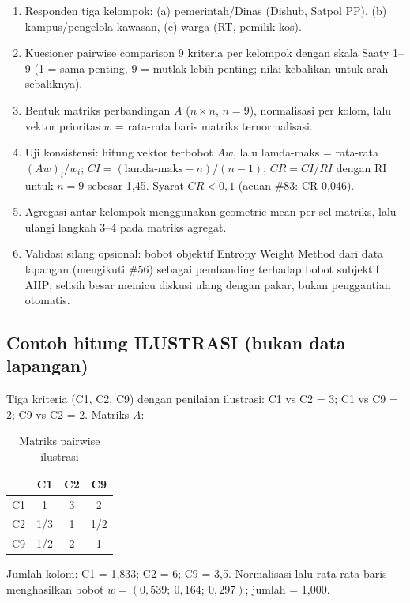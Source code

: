 \documentclass[a4paper,11pt]{article}
\begin{document}
\begin{enumerate}
\item Responden tiga kelompok: (a) pemerintah/Dinas (Dishub, Satpol PP), (b) kampus/pengelola kawasan, (c) warga (RT, pemilik kos).
\item Kuesioner pairwise comparison 9 kriteria per kelompok dengan skala Saaty 1--9 (1 = sama penting, 9 = mutlak lebih penting; nilai kebalikan untuk arah sebaliknya).
\item Bentuk matriks perbandingan \(A\) (\(n \times n\), \(n = 9\)), normalisasi per kolom, lalu vektor prioritas \(w\) = rata-rata baris matriks ternormalisasi.
\item Uji konsistensi: hitung vektor terbobot \(Aw\), lalu lamda-maks = rata-rata \((Aw)_i / w_i\); \(CI = (\text{lamda-maks} - n)/(n-1)\); \(CR = CI/RI\) dengan RI untuk \(n = 9\) sebesar 1,45. Syarat \(CR < 0{,}1\) (acuan \#83: CR 0,046).
\item Agregasi antar kelompok menggunakan geometric mean per sel matriks, lalu ulangi langkah 3--4 pada matriks agregat.
\item Validasi silang opsional: bobot objektif Entropy Weight Method dari data lapangan (mengikuti \#56) sebagai pembanding terhadap bobot subjektif AHP; selisih besar memicu diskusi ulang dengan pakar, bukan penggantian otomatis.
\end{enumerate}

\subsection{Contoh hitung ILUSTRASI (bukan data lapangan)}

Tiga kriteria (C1, C2, C9) dengan penilaian ilustrasi: C1 vs C2 = 3; C1 vs C9 = 2; C9 vs C2 = 2. Matriks \(A\):

\begin{table}[htbp]
\centering
\begin{tabular}{c|ccc}
\toprule
 & C1 & C2 & C9 \\
\midrule
C1 & 1 & 3 & 2 \\
C2 & 1/3 & 1 & 1/2 \\
C9 & 1/2 & 2 & 1 \\
\bottomrule
\end{tabular}
\caption{Matriks pairwise ilustrasi}
\end{table}

Jumlah kolom: C1 = 1,833; C2 = 6; C9 = 3,5. Normalisasi lalu rata-rata baris menghasilkan bobot \(w = (0{,}539;\ 0{,}164;\ 0{,}297)\); jumlah = 1,000.
\end{document}
